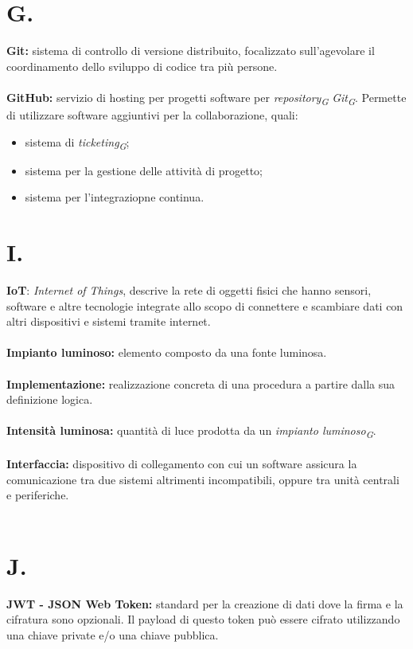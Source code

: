 \documentclass[a4paper, 12pt]{article}
\begin{document}
\newpage
\section*{G.}
\textbf{Git:} sistema di controllo di versione distribuito, focalizzato
sull'agevolare il coordinamento dello sviluppo di codice tra più persone. \\ \\
\textbf{GitHub:} servizio di hosting per progetti software per
\textit{repository\textsubscript{G}} \textit{Git\textsubscript{G}}. Permette di
utilizzare software aggiuntivi per la collaborazione, quali:
\begin{itemize}
    \item sistema di \textit{ticketing\textsubscript{G}};
    \item sistema per la gestione delle attività di progetto;
    \item sistema per l'integraziopne continua.
\end{itemize}
\newpage

\section*{I.}
\textbf{IoT}: \textit{Internet of Things}, descrive la rete di oggetti fisici che hanno sensori, software e altre tecnologie integrate allo scopo di connettere e scambiare dati con altri dispositivi e sistemi tramite internet. \\ \\
\textbf{Impianto luminoso:} elemento composto da una fonte luminosa. \\ \\
\textbf{Implementazione:} realizzazione concreta di una procedura a partire dalla sua definizione logica. \\ \\
\textbf{Intensità luminosa:} quantità di luce prodotta da un \textit{impianto luminoso\textsubscript{G}}. \\ \\
\textbf{Interfaccia:} dispositivo di collegamento con cui un software assicura la comunicazione tra due sistemi altrimenti incompatibili, oppure tra unità centrali e periferiche. \\ \\

\newpage
\section*{J.}
\textbf{JWT - JSON Web Token:} standard per la creazione di dati dove la firma e la cifratura sono opzionali. Il payload di questo token può essere cifrato utilizzando una chiave private e/o una chiave pubblica.
\end{document}
